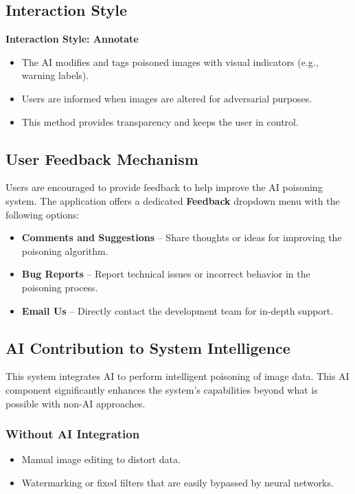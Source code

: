 \subsection{Interaction Style}
\textbf{Interaction Style: Annotate}

\begin{itemize}
    \item The AI modifies and tags poisoned images with visual indicators (e.g., warning labels).
    \item Users are informed when images are altered for adversarial purposes.
    \item This method provides transparency and keeps the user in control.
\end{itemize}

\subsection{User Feedback Mechanism}
Users are encouraged to provide feedback to help improve the AI poisoning system. The application offers a dedicated \textbf{Feedback} dropdown menu with the following options:
\begin{itemize}
    \item \textbf{Comments and Suggestions} – Share thoughts or ideas for improving the poisoning algorithm.
    \item \textbf{Bug Reports} – Report technical issues or incorrect behavior in the poisoning process.
    \item \textbf{Email Us} – Directly contact the development team for in-depth support.
\end{itemize}

\subsection{AI Contribution to System Intelligence}

This system integrates AI to perform intelligent poisoning of image data. 
This AI component significantly enhances the system’s capabilities beyond what 
is possible with non-AI approaches.

\subsubsection{Without AI Integration}
\begin{itemize}
    \item Manual image editing to distort data.
    \item Watermarking or fixed filters that are easily bypassed by neural networks.
\end{itemize}

